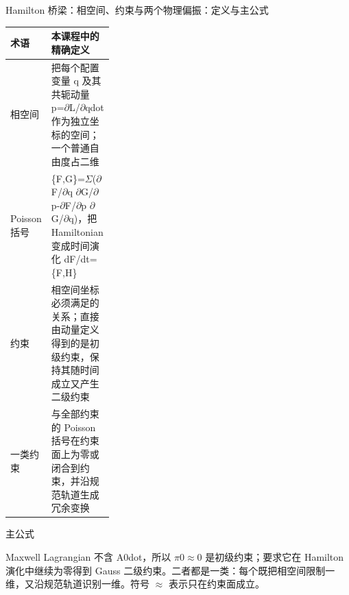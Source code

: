 \begin{frame}[t]{Hamilton 桥梁：相空间、约束与两个物理偏振：定义与主公式}
\footnotesize\begin{tabularx}{\linewidth}{p{0.30\linewidth}Y}
\toprule 术语 & 本课程中的精确定义\\\midrule
{} 相空间 & 把每个配置变量 q 及其共轭动量 p=\ensuremath{\partial}L/\allowbreak{}\ensuremath{\partial}qdot 作为独立坐标的空间；一个普通自由度占二维\\
 Poisson 括号 & \{F,G\}=\ensuremath{\Sigma}(\ensuremath{\partial}F/\allowbreak{}\ensuremath{\partial}q \ensuremath{\partial}G/\allowbreak{}\ensuremath{\partial}p-\ensuremath{\partial}F/\allowbreak{}\ensuremath{\partial}p \ensuremath{\partial}G/\allowbreak{}\ensuremath{\partial}q)，把 Hamiltonian 变成时间演化 dF/\allowbreak{}dt=\{F,H\}\\
 约束 & 相空间坐标必须满足的关系；直接由动量定义得到的是初级约束，保持其随时间成立又产生二级约束\\
 一类约束 & 与全部约束的 Poisson 括号在约束面上为零或闭合到约束，并沿规范轨道生成冗余变换\\
\bottomrule\end{tabularx}\vspace{0.15cm}
\begin{block}{ 主公式}\centering{}\end{block}
Maxwell Lagrangian 不含 A0dot，所以 \ensuremath{\pi}0\ensuremath{\approx}0 是初级约束；要求它在 Hamilton 演化中继续为零得到 Gauss 二级约束。二者都是一类：每个既把相空间限制一维，又沿规范轨道识别一维。符号 \ensuremath{\approx} 表示只在约束面成立。
\end{frame}

